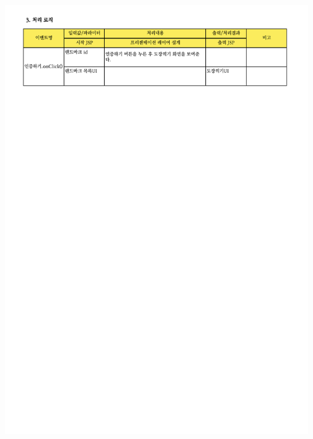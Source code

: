 {{{{{{{{{{{{{{{{{{{{{{{{{{{{{{{{{{{{{{{{{{{{{{{{{{{{{{{{{{{\includegraphics[width=20cm]{./Figure/Analysis/Display/community/community_18.pdf} \\
}}}}}}}}}}}}}}}}}}}}}}}}}}}}}}}}}}}}}}}}}}}}}}}}}}}}}}}}}}}
